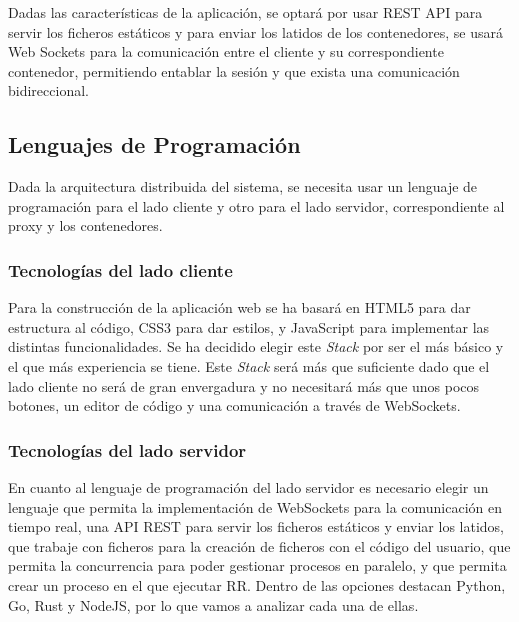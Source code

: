 Dadas las características de la aplicación, se optará por usar REST API para servir los ficheros estáticos y para enviar los latidos de los contenedores, se usará Web Sockets para la comunicación entre el cliente y su correspondiente contenedor, permitiendo entablar la sesión y que exista una comunicación bidireccional. 

\subsection{Lenguajes de Programación} \label{sec:programacion}

Dada la arquitectura distribuida del sistema, se necesita usar un lenguaje de programación para el lado cliente y otro para el lado servidor, correspondiente al proxy y los contenedores.

\subsubsection{Tecnologías del lado cliente} \label{subsubsec:tecnologias-cliente}

Para la construcción de la aplicación web se ha basará en HTML5 para dar estructura al código, CSS3 para dar estilos, y JavaScript para implementar las distintas funcionalidades. Se ha decidido elegir este \textit{Stack} por ser el más básico y el que más experiencia se tiene. Este \textit{Stack} será más que suficiente dado que el lado cliente no será de gran envergadura y no necesitará más que unos pocos botones, un editor de código y una comunicación a través de WebSockets.


\subsubsection{Tecnologías del lado servidor} \label{sec:tecnologias-servidor}

En cuanto al lenguaje de programación del lado servidor es necesario elegir un lenguaje que permita la implementación de WebSockets para la comunicación en tiempo real, una API REST para servir los ficheros estáticos y enviar los latidos, que trabaje con ficheros para la creación de ficheros con el código del usuario, que permita la concurrencia para poder gestionar procesos en paralelo, y que permita crear un proceso en el que ejecutar RR.
Dentro de las opciones destacan Python, Go, Rust y NodeJS, por lo que vamos a analizar cada una de ellas.

